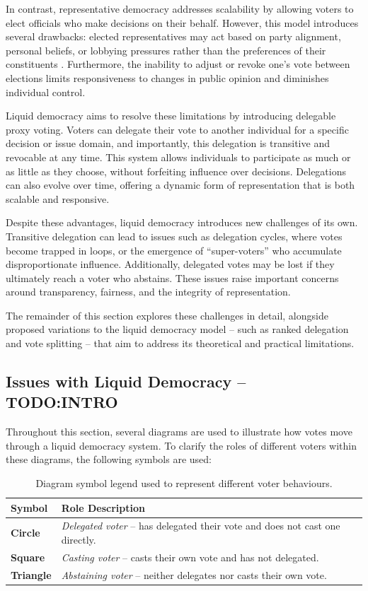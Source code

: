 In contrast, representative democracy addresses scalability by allowing voters to elect officials who make decisions on their behalf. However, this model introduces several drawbacks: elected representatives may act based on party alignment, personal beliefs, or lobbying pressures rather than the preferences of their constituents \citep{blum_liquid_2016}. Furthermore, the inability to adjust or revoke one's vote between elections limits responsiveness to changes in public opinion and diminishes individual control.

Liquid democracy aims to resolve these limitations by introducing delegable proxy voting. Voters can delegate their vote to another individual for a specific decision or issue domain, and importantly, this delegation is transitive and revocable at any time. This system allows individuals to participate as much or as little as they choose, without forfeiting influence over decisions. Delegations can also evolve over time, offering a dynamic form of representation that is both scalable and responsive.

Despite these advantages, liquid democracy introduces new challenges of its own. Transitive delegation can lead to issues such as delegation cycles, where votes become trapped in loops, or the emergence of ``super-voters'' who accumulate disproportionate influence. Additionally, delegated votes may be lost if they ultimately reach a voter who abstains. These issues raise important concerns around transparency, fairness, and the integrity of representation.

The remainder of this section explores these challenges in detail, alongside proposed variations to the liquid democracy model -- such as ranked delegation and vote splitting -- that aim to address its theoretical and practical limitations.

\subsection{Issues with Liquid Democracy -- TODO:INTRO}
Throughout this section, several diagrams are used to illustrate how votes move through a liquid democracy system. To clarify the roles of different voters within these diagrams, the following symbols are used:
\begin{table}[H]
  \centering
  \begin{tabular}{|@{}|l|l@{}|}
  \hline
  \textbf{Symbol} & \textbf{Role Description} \\ \hline
  \textbf{Circle}   & \textit{Delegated voter} -- has delegated their vote and does not cast one directly. \\
  \textbf{Square}   & \textit{Casting voter} -- casts their own vote and has not delegated. \\
  \textbf{Triangle} & \textit{Abstaining voter} -- neither delegates nor casts their own vote. \\
  \hline
  \end{tabular}
  \caption{Diagram symbol legend used to represent different voter behaviours.}
\end{table}  

